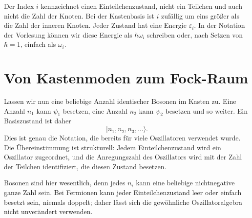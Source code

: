 Der Index \(i\) kennzeichnet einen Einteilchenzustand, nicht ein Teilchen und auch nicht die Zahl der Knoten. Bei der Kastenbasis ist \(i\) zufällig um eins größer als die Zahl der inneren Knoten. Jeder Zustand hat eine Energie \(\varepsilon_i\). In der Notation der Vorlesung können wir diese Energie als \(\hbar\omega_i\) schreiben oder, nach Setzen von \(\hbar=1\), einfach als \(\omega_i\).

\begin{classroomqa}
\end{classroomqa}

\begin{classroomqa}
\end{classroomqa}

\section{Von Kastenmoden zum Fock-Raum}

Lassen wir nun eine beliebige Anzahl identischer Bosonen im Kasten zu. Eine Anzahl \(n_1\) kann \(\psi_1\) besetzen, eine Anzahl \(n_2\) kann \(\psi_2\) besetzen und so weiter. Ein Basiszustand ist daher
\begin{equation}
|n_1,n_2,n_3,\ldots\rangle.
\end{equation}
Dies ist genau die Notation, die bereits für viele Oszillatoren verwendet wurde. Die Übereinstimmung ist strukturell: Jedem Einteilchenzustand wird ein Oszillator zugeordnet, und die Anregungszahl des Oszillators wird mit der Zahl der Teilchen identifiziert, die diesen Zustand besetzen.

Bosonen sind hier wesentlich, denn jedes \(n_i\) kann eine beliebige nichtnegative ganze Zahl sein. Bei Fermionen kann jeder Einteilchenzustand leer oder einfach besetzt sein, niemals doppelt; daher lässt sich die gewöhnliche Oszillatoralgebra nicht unverändert verwenden.


